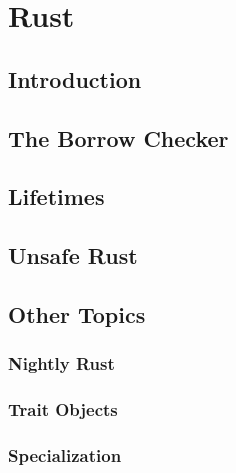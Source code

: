 \chapter{Rust\label{ch:rust}}

\section{Introduction}
\blindtext{}
\cite{linus}

\section{The Borrow Checker}
\blindtext{}
 
\section{Lifetimes\label{sec:rust-lifetimes}}
\blindtext{}
 
\section{Unsafe Rust}
\blindtext{}

\section{Other Topics}
\blindtext{}

\subsection{Nightly Rust}
\blindtext{}

\subsection{Trait Objects\label{sec:trait-objects}}
\blindtext{}

\subsection{Specialization\label{sec:specialization}}
\blindtext{}
